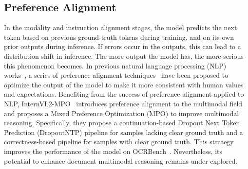 \begin{table*}[!t]
    \centering
    \scalebox{0.9}{
    
    }
    \vspace{-0.5em}
    \caption{Representative datasets and benchmarks for Text-rich Image Understanding. Each dataset is marked for training and testing typically according to its content, functions, and user requirements. 
    }
    \label{tab:datawithbenchmark}
    \vspace{-1.5em}
\end{table*}

\subsection{Preference Alignment}
In the modality and instruction alignment stages, the model predicts the next token based on previous ground-truth tokens during training, and on its own prior outputs during inference. If errors occur in the outputs, this can lead to a distribution shift in inference. The more output the model has, the more serious this phenomenon becomes. In previous natural language processing (NLP) works~\cite{lai2024step,pang2025iterative}, a series of preference alignment techniques~\cite{rafailov2024direct, ouyang2022training,shao2024deepseekmath,wang2024mdpo} have been proposed to optimize the output of the model to make it more consistent with human values and expectations. Benefiting from the success of preference alignment applied to NLP, InternVL2-MPO~\cite{wang2024enhancing} introduces preference alignment to the multimodal field and proposes a Mixed Preference Optimization (MPO) to improve multimodal reasoning. Specifically, they propose a continuation-based Dropout Next Token Prediction (DropoutNTP) pipeline for samples lacking clear ground truth and a correctness-based pipeline for samples with clear ground truth. This strategy improves the performance of the model on OCRBench~\cite{fu2024ocrbench}. Nevertheless, its potential to enhance document multimodal reasoning remains under-explored. 



